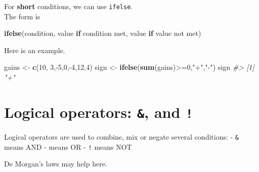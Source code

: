 \documentclass[]{book}
\newenvironment{Shaded}{}{}
\newcommand{\CommentTok}[1]{\textcolor[rgb]{0.38,0.63,0.69}{\textit{#1}}}
\newcommand{\ControlFlowTok}[1]{\textcolor[rgb]{0.00,0.44,0.13}{\textbf{#1}}}
\newcommand{\DecValTok}[1]{\textcolor[rgb]{0.25,0.63,0.44}{#1}}
\newcommand{\KeywordTok}[1]{\textcolor[rgb]{0.00,0.44,0.13}{\textbf{#1}}}
\newcommand{\NormalTok}[1]{#1}
\newcommand{\OperatorTok}[1]{\textcolor[rgb]{0.40,0.40,0.40}{#1}}
\newcommand{\StringTok}[1]{\textcolor[rgb]{0.25,0.44,0.63}{#1}}
\theoremstyle{definition}
\theoremstyle{definition}
\theoremstyle{definition}
\theoremstyle{remark}
\begin{document}
For \textbf{short} conditions, we can use \texttt{ifelse}.\\
The form is

\begin{Shaded}
\begin{Highlighting}[]
\KeywordTok{ifelse}\NormalTok{(condition, value }\ControlFlowTok{if}\NormalTok{ condition met, value }\ControlFlowTok{if}\NormalTok{ value not met)}
\end{Highlighting}
\end{Shaded}

Here is an example.

\begin{Shaded}
\begin{Highlighting}[]
\NormalTok{gains <-}\StringTok{ }\KeywordTok{c}\NormalTok{(}\DecValTok{10}\NormalTok{, }\DecValTok{3}\NormalTok{,}\OperatorTok{-}\DecValTok{5}\NormalTok{,}\DecValTok{0}\NormalTok{,}\OperatorTok{-}\DecValTok{4}\NormalTok{,}\DecValTok{12}\NormalTok{,}\DecValTok{4}\NormalTok{)}
\NormalTok{sign <-}\StringTok{ }\KeywordTok{ifelse}\NormalTok{(}\KeywordTok{sum}\NormalTok{(gains)}\OperatorTok{>=}\DecValTok{0}\NormalTok{,}\StringTok{"+"}\NormalTok{,}\StringTok{"-"}\NormalTok{)}
\NormalTok{sign}
\CommentTok{#> [1] "+"}
\end{Highlighting}
\end{Shaded}

\hypertarget{logical-operators-and}{%
\section{\texorpdfstring{Logical operators: \texttt{\&},
\texttt{\textbar{}} and
\texttt{!}}{Logical operators: \&, \textbar{} and !}}\label{logical-operators-and}}

Logical operators are used to combine, mix or negate several conditions:
- \texttt{\&} means AND - \texttt{\textbar{}} means OR - \texttt{!}
means NOT

De Morgan's laws may help here.
\end{document}
